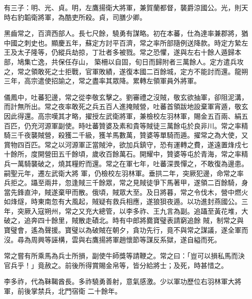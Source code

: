 \begin{pinyinscope}
 有三子：明、光、貞。明，左鷹揚衛大將軍，兼賀蘭都督，襲爵涼國公。光，則天時右豹韜衛將軍，為酷吏所殺。貞，司膳少卿。



 黑齒常之，百濟西部人。長七尺餘，驍勇有謀略。初在本蕃，仕為達率兼郡將，猶中國之刺史也。顯慶五年，蘇定方討平百濟，常之率所部隨例送降款。時定方縶左王及太子隆等，仍縱兵劫掠，丁壯者多被戮。常之恐懼，遂與左右十餘人遁歸本部，鳩集亡逸，共保任存山，
 築柵以自固，旬日而歸附者三萬餘人。定方遣兵攻之，常之領敢死之士拒戰，官軍敗績，遂復本國二百餘城，定方不能討而還。龍朔三年，高宗遣使招諭之，常之盡率其眾降。累轉左領軍員外將軍。



 儀鳳中，吐蕃犯邊，常之從李敬玄擊之。劉審禮之沒賊，敬玄欲抽軍，卻阻泥溝，而計無所出。常之夜率敢死之兵五百人進掩賊營，吐蕃首領跋地設棄軍宵遁，敬玄因此得還。高宗嘆其才略，擢授左武衛將軍，兼檢校左羽林軍，賜金五百兩、絹五
 百匹，仍充河源軍副使。時吐蕃贊婆及素和貴等賊徒三萬餘屯於良非川。常之率精騎三千夜襲賊營，殺獲二千級，獲羊馬數萬，贊婆等單騎而遁。擢常之為大使，又賞物四百匹。常之以河源軍正當賊沖，欲加兵鎮守，恐有運轉之費，遂遠置烽戍七十餘所，度開營田五千餘頃，歲收百餘萬石。開耀中，贊婆等屯於青海，常之率精兵一萬騎襲破之，燒其糧貯而還。常之在軍七年，吐蕃深畏憚之，不敢復為邊患。嗣聖元年，遷左武衛大將
 軍，仍檢校左羽林軍。垂拱二年，突厥犯邊，命常之率兵拒之。躡至兩井，忽逢賊三千餘眾，常之見賊徒爭下馬著甲，遂領二百餘騎，身當先鋒直沖，賊遂棄甲而散。俄頃，賊眾大至。及日將暮，常之令伐木，營中燃火如烽燧，時東南忽有大風起，賊疑有救兵相應，遂狼狽夜遁。以功進封燕國公。三年，突厥入寇朔州，常之又充大總管，以李多祚、王九言為副。追躡至黃花堆，大破之，追奔四十餘里，賊散走磧北。時有中郎將爨寶璧表請窮追餘
 賊，制常之與寶璧會，遙為聲援。寶璧以為破賊在朝夕，貪功先行，竟不與常之謀議，遂全軍而沒。尋為周興等誣構，雲與右鷹揚將軍趙懷節等謀反系獄，遂自縊而死。



 常之嘗有所乘馬為兵士所損，副使牛師獎等請鞭之。常之曰：「豈可以損私馬而決官兵乎！」竟赦之。前後所得賞賜金帛等，皆分給將士；及死，時甚惜之。



 李多祚，代為靺鞨酋長。多祚驍勇善射，意氣感激。少以軍功歷位右羽林軍大將軍，前後掌禁兵，北門宿衛
 二十餘年。




\end{pinyinscope}
